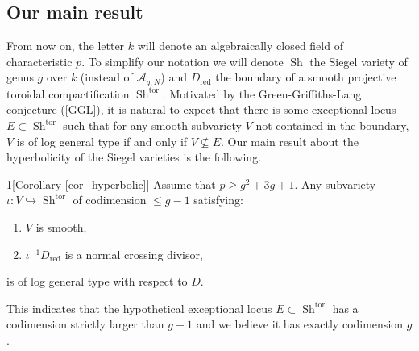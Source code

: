 \documentclass[11pt]{amsart}
\numberwithin{subsection}{section}
\numberwithin{figure}{section}
\numberwithin{table}{section}
\theoremstyle{1}
\theoremstyle{2}
\DeclareMathOperator{\Sh}{Sh}
\DeclareMathOperator{\tor}{tor}
\DeclareMathOperator{\red}{red}
\begin{document}
\subsection{Our main result}
From now on, the letter $k$ will denote an algebraically closed field of characteristic $p$. To simplify our notation we will denote $\Sh$ the Siegel variety of genus $g$ over $k$ (instead of $\mathcal{A}_{g,N}$) and $D_{\red}$ the boundary of a smooth projective toroidal compactification $\Sh^{\tor}$. Motivated by the Green-Griffiths-Lang conjecture (\ref{GGL}), it is natural to expect that there is some exceptional locus $E \subset \Sh^{\tor}$ such that for any smooth subvariety $V$ not contained in the boundary, $V$ is of log general type if and only if $V \nsubseteq E$. Our main result about the hyperbolicity of the Siegel varieties is the following.
\begin{customthm}{1}[Corollary \ref{cor_hyperbolic}]
Assume that $p \geq g^2+3g+1$. Any subvariety $\iota : V \hookrightarrow \Sh^{\tor}$ of codimension $\leq g-1$ satisfying:
\begin{enumerate}
\item $V$ is smooth,
\item $\iota^{-1}D_{\red}$ is a normal crossing divisor,
\end{enumerate}
is of log general type with respect to $D$.
\end{customthm}
\vspace{0.2cm}
This indicates that the hypothetical exceptional locus $E \subset \Sh^{\tor}$ has a codimension strictly larger than $g-1$ and we believe it has exactly codimension $g$.
\end{document}
